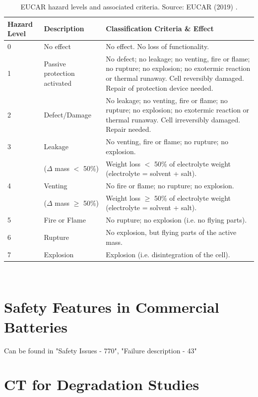 \begin{table}[ht]
    \centering
        \begin{footnotesize}
            \begin{tabular}{|p{13mm} p{28mm} p{102mm}|}
                \hline
                \rowcolor{bluepoli!40}
                \textbf{Hazard Level} & \textbf{Description} & \textbf{Classification Criteria \& Effect}\T\B \\
                \hline \hline
                
                0 & No effect & No effect. No loss of functionality.\T\B\\
                \hline

                1 & Passive protection activated & No defect; no leakage; no venting, fire or flame; no rupture; no explosion; no exotermic reaction or thermal runaway. Cell reversibly damaged. Repair of protection device needed.\T\B\\
                \hline

                2 & Defect/Damage & No leakage; no venting, fire or flame; no rupture; no explosion; no exotermic reaction or thermal runaway. Cell irreversibly damaged. Repair needed.\T\B\\
                \hline

                3 & Leakage & No venting, fire or flame; no rupture; no explosion.\\
                & ($\Delta$ mass $<$ 50\%) & Weight loss $<$ 50\% of electrolyte weight (electrolyte = solvent + salt).\T\B\\
                \hline

                4 & Venting & No fire or flame; no rupture; no explosion.\\
                & ($\Delta$ mass $\geq$ 50\%) & Weight loss $\geq$ 50\% of electrolyte weight (electrolyte = solvent + salt).\T\B\\
                \hline

                5 & Fire or Flame & No rupture; no explosion (i.e. no flying parts).\T\B\\
                \hline

                6 & Rupture & No explosion, but flying parts of the active mass.\T\B\\
                \hline

                7 & Explosion & Explosion (i.e. disintegration of the cell).\T\B\\
                \hline
            \end{tabular}
            \\[10pt]
            \caption[EUCAR hazard levels]{EUCAR hazard levels and associated criteria. Source: EUCAR (2019) \cite{eucar2019}.}
            \label{table:eucar}
        \end{footnotesize}
\end{table}

\section{Safety Features in Commercial Batteries}
\label{sec:safety-features}
Can be found in "Safety Issues - 770", "Failure description - 43"

\section{CT for Degradation Studies}
\label{sec:ct-degradation-studies}